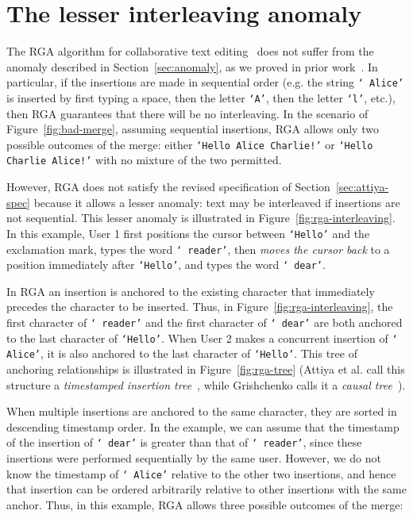 \documentclass[sigconf]{acmart}
\begin{document}
\section{The lesser interleaving anomaly}\label{sec:lesser}

The RGA algorithm for collaborative text editing~\cite{Roh:2011dw} does not suffer from the anomaly described in Section~\ref{sec:anomaly}, as we proved in prior work~\cite{ExtendedVersion,AFP}.
In particular, if the insertions are made in sequential order (e.g. the string \texttt{` Alice'} is inserted by first typing a space, then the letter \texttt{`A'}, then the letter \texttt{`l'}, etc.), then RGA guarantees that there will be no interleaving.
In the scenario of Figure~\ref{fig:bad-merge}, assuming sequential insertions, RGA allows only two possible outcomes of the merge: either \texttt{`Hello Alice Charlie!'} or \texttt{`Hello Charlie Alice!'} with no mixture of the two permitted.

However, RGA does not satisfy the revised specification of Section~\ref{sec:attiya-spec} because it allows a lesser anomaly: text may be interleaved if insertions are not sequential.
This lesser anomaly is illustrated in Figure~\ref{fig:rga-interleaving}.
In this example, User 1 first positions the cursor between \texttt{`Hello'} and the exclamation mark, types the word \texttt{` reader'}, then \emph{moves the cursor back} to a position immediately after \texttt{`Hello'}, and types the word \texttt{` dear'}.

In RGA an insertion is anchored to the existing character that immediately precedes the character to be inserted.
Thus, in Figure~\ref{fig:rga-interleaving}, the first character of \texttt{` reader'} and the first character of \texttt{` dear'} are both anchored to the last character of \texttt{`Hello'}.
When User 2 makes a concurrent insertion of \texttt{` Alice'}, it is also anchored to the last character of \texttt{`Hello'}.
This tree of anchoring relationships is illustrated in Figure~\ref{fig:rga-tree} (Attiya et al. call this structure a \emph{timestamped insertion tree}~\cite{Attiya:2016kh}, while Grishchenko calls it a \emph{causal tree}~\cite{Grishchenko:2014eh}).

When multiple insertions are anchored to the same character, they are sorted in descending timestamp order.
In the example, we can assume that the timestamp of the insertion of \texttt{` dear'} is greater than that of \texttt{` reader'}, since these insertions were performed sequentially by the same user.
However, we do not know the timestamp of \texttt{` Alice'} relative to the other two insertions, and hence that insertion can be ordered arbitrarily relative to other insertions with the same anchor.
Thus, in this example, RGA allows three possible outcomes of the merge:
\end{document}
